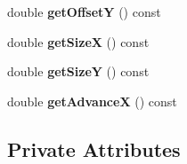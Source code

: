 \begin{DoxyCompactItemize}
double {\bfseries get\+OffsetY} () const
\item 
\mbox{\label{classflounder_1_1character_a0a7197d6203b4b7cbf79b96d52b41015}} 
double {\bfseries get\+SizeX} () const
\item 
\mbox{\label{classflounder_1_1character_aadee37791914443e8a1e17a621ab08d8}} 
double {\bfseries get\+SizeY} () const
\item 
\mbox{\label{classflounder_1_1character_a6ee097f0940f2de06d263b4c7415137f}} 
double {\bfseries get\+AdvanceX} () const
\end{DoxyCompactItemize}
\subsection*{Private Attributes}
